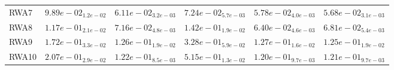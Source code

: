 \documentclass{article}
\begin{document}
\begin{table}
\begin{scriptsize}
\begin{tabular}{llllll}
RWA7 & $  9.89e-02_{ 1.2e-02}$ & $  6.11e-02_{ 3.2e-03}$ & $  7.24e-02_{ 5.7e-03}$ & \cellcolor{gray25}$  5.78e-02_{ 4.0e-03}$ & \cellcolor{gray95}$  5.68e-02_{ 3.1e-03}$ \\
RWA8 & $  1.17e-01_{ 2.1e-02}$ & $  7.16e-02_{ 4.8e-03}$ & $  1.42e-01_{ 1.9e-02}$ & \cellcolor{gray95}$  6.40e-02_{ 4.6e-03}$ & \cellcolor{gray25}$  6.81e-02_{ 5.4e-03}$ \\
RWA9 & $  1.72e-01_{ 3.3e-02}$ & \cellcolor{gray25}$  1.26e-01_{ 1.9e-02}$ & $  3.28e-01_{ 5.9e-02}$ & $  1.27e-01_{ 1.6e-02}$ & \cellcolor{gray95}$  1.25e-01_{ 1.9e-02}$ \\
RWA10 & $  2.07e-01_{ 2.9e-02}$ & $  1.22e-01_{ 8.5e-03}$ & $  5.15e-01_{ 1.3e-02}$ & \cellcolor{gray95}$  1.20e-01_{ 9.7e-03}$ & \cellcolor{gray25}$  1.21e-01_{ 9.7e-03}$ \\
\hline
\end{tabular}
\end{scriptsize}
\end{table}
\end{document}
